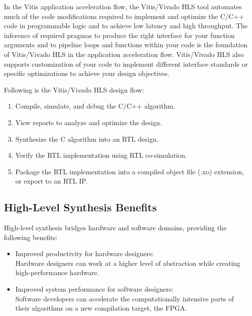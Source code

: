 \par In the Vitis application acceleration flow, the Vitis/Vivado HLS tool automates much of the code modifications required to implement and optimize the C/C++ code in programmable logic and to achieve low latency and high throughput. The inference of required pragmas to produce the right interface for your function arguments and to pipeline loops and functions within your code is the foundation of Vitis/Vivado HLS in the application acceleration flow. Vitis/Vivado HLS also supports customization of your code to implement different interface standards or specific optimizations to achieve your design objectives.

Following is the Vitis/Vivado HLS design flow:
\begin{enumerate}
    \item Compile, simulate, and debug the C/C++ algorithm.
    \item View reports to analyze and optimize the design.
    \item Synthesize the C algorithm into an RTL design.
    \item Verify the RTL implementation using RTL co-simulation.
    \item Package the RTL implementation into a compiled object file (.xo) extension, or export to an RTL IP.
\end{enumerate}

\subsection{High-Level Synthesis Benefits}
High-level synthesis bridges hardware and software domains, providing the following benefits:
\begin{itemize}
  \item Improved productivity for hardware designers:\\ Hardware designers can work at a higher level of abstraction while creating high-performance hardware.
  \item Improved system performance for software designers:\\ Software developers can accelerate the computationally intensive parts of their algorithms on a new compilation target, the FPGA. 
\end{itemize}

